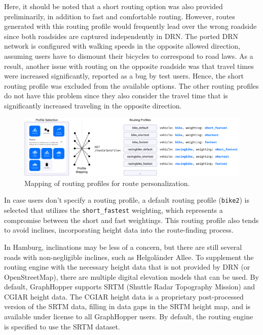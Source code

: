 Here, it should be noted that a short routing option was also provided preliminarily, in addition to fast and comfortable routing. However, routes generated with this routing profile would frequently lead over the wrong roadside since both roadsides are captured independently in DRN. The ported DRN network is configured with walking speeds in the opposite allowed direction, assuming users have to dismount their bicycles to correspond to road laws. As a result, another issue with routing on the opposite roadside was that travel times were increased significantly, reported as a bug by test users. Hence, the short routing profile was excluded from the available options. The other routing profiles do not have this problem since they also consider the travel time that is significantly increased traveling in the opposite direction.

\begin{figure}[t]
\centering
\includegraphics[width=\linewidth]{images/routing-profile-mapping.pdf}
\caption{Mapping of routing profiles for route personalization.}
\label{fig:routing-profile-mapping}
\end{figure}

In case users don't specify a routing profile, a default routing profile (\texttt{bike2}) is selected that utilizes the \texttt{short\_fastest} weighting, which represents a compromise between the short and fast weightings. This routing profile also tends to avoid inclines, incorporating height data into the route-finding process.

In Hamburg, inclinations may be less of a concern, but there are still several roads with non-negligible inclines, such as Helgoländer Allee. To supplement the routing engine with the necessary height data that is not provided by DRN (or OpenStreetMap), there are multiple digital elevation models that can be used. By default, GraphHopper supports SRTM (Shuttle Radar Topography Mission) \cite{farr_shuttle_2000, farr_shuttle_2007} and CGIAR \cite{jarvis_hole_2008} height data. The CGIAR height data is a proprietary post-processed version of the SRTM data, filling in data gaps in the SRTM height map, and is available under license to all GraphHopper users. By default, the routing engine is specified to use the SRTM dataset.


